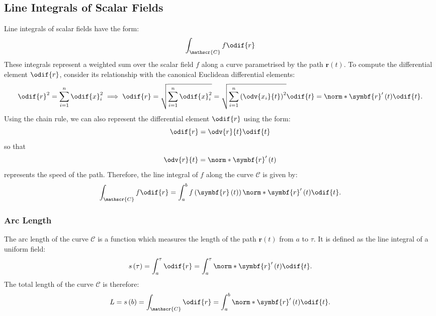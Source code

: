 \documentclass{article}
\begin{document}
\subsection{Line Integrals of Scalar Fields}
Line integrals of scalar fields have the form:
\begin{equation*}
    \int_{\mathscr{C}} f \odif{r}
\end{equation*}
These integrals represent a weighted sum over the scalar field \(f\)
along a curve parametrised by the path \(\symbf{r}\left( t \right)\).
To compute the differential element \(\odif{r}\), consider its
relationship with the canonical Euclidean differential elements:
\begin{equation*}
    \odif{r}^2 = \sum_{i = 1}^n \odif{x}_i^2 \implies \odif{r} = \sqrt{\sum_{i = 1}^n \odif{x}_i^2} = \sqrt{\sum_{i = 1}^n \left( \odv{x_i}{t} \right)^2} \odif{t} = \norm*{\symbf{r}'\left( t \right)} \odif{t}.
\end{equation*}
Using the chain rule, we can also represent the differential element
\(\odif{r}\) using the form:
\begin{equation*}
    \odif{r} = \odv{r}{t} \odif{t}
\end{equation*}
so that
\begin{equation*}
    \odv{r}{t} = \norm*{\symbf{r}'\left( t \right)}
\end{equation*}
represents the speed of the path. Therefore, the line integral of \(f\)
along the curve \(\mathscr{C}\) is given by:
\begin{equation*}
    \int_{\mathscr{C}} f \odif{r} = \int_a^b f\left( \symbf{r}\left( t \right) \right) \norm*{\symbf{r}'\left( t \right)} \odif{t}.
\end{equation*}
\subsubsection{Arc Length}
The arc length of the curve \(\mathscr{C}\) is a function which
measures the length of the path \(\symbf{r}\left( t \right)\) from
\(a\) to \(\tau\). It is defined as the line integral of a uniform
field:
\begin{equation*}
    s\left( \tau \right) = \int_a^\tau \odif{r} = \int_a^\tau \norm*{\symbf{r}'\left( t \right)} \odif{t}.
\end{equation*}
The total length of the curve \(\mathscr{C}\) is therefore:
\begin{equation*}
    L = s\left( b \right) = \int_{\mathscr{C}} \odif{r} = \int_a^b \norm*{\symbf{r}'\left( t \right)} \odif{t}.
\end{equation*}
\end{document}

